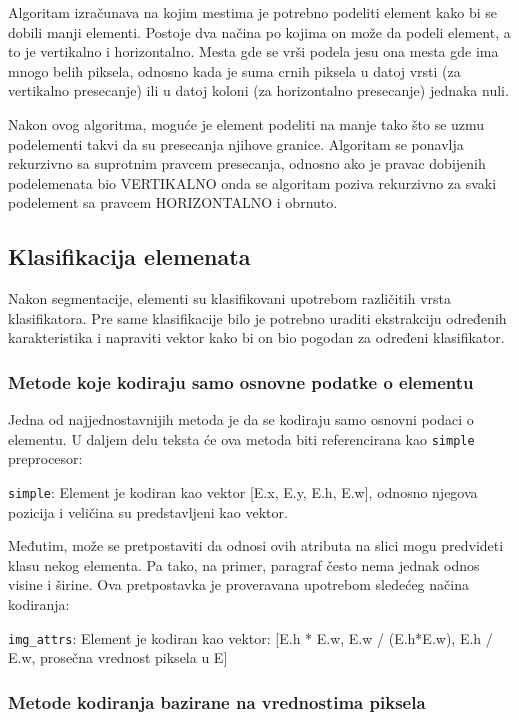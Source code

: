 \documentclass[]{amsart}
\begin{document}
Algoritam izračunava na kojim mestima je potrebno podeliti element kako bi se dobili manji elementi. Postoje dva načina po kojima on može da podeli element, a to je
vertikalno i horizontalno. Mesta gde se vrši podela jesu ona mesta gde ima mnogo belih piksela, odnosno kada je suma crnih piksela u datoj vrsti (za vertikalno presecanje)
ili u datoj koloni (za horizontalno presecanje) jednaka nuli.

Nakon ovog algoritma, moguće je element podeliti na manje tako što se uzmu podelementi takvi da su presecanja njihove granice. Algoritam se ponavlja rekurzivno
sa suprotnim pravcem presecanja, odnosno ako je pravac dobijenih podelemenata bio VERTIKALNO onda se algoritam poziva rekurzivno za svaki podelement sa pravcem HORIZONTALNO
i obrnuto. 

\subsection{Klasifikacija elemenata}
\label{sec:org4f634b4}

Nakon segmentacije, elementi su klasifikovani upotrebom različitih vrsta klasifikatora. Pre same klasifikacije bilo je potrebno uraditi ekstrakciju
određenih karakteristika i napraviti vektor kako bi on bio pogodan za određeni klasifikator.




\subsubsection{Metode koje kodiraju samo osnovne podatke o elementu}
\label{sec:orgd93cd26}

Jedna od najjednostavnijih metoda je da se kodiraju samo osnovni podaci o elementu. U daljem delu teksta će ova metoda biti referencirana kao \texttt{simple} preprocesor:

\texttt{simple}: Element je kodiran kao vektor [E.x, E.y, E.h, E.w], odnosno njegova pozicija i veličina su predstavljeni kao vektor.


Međutim, može se pretpostaviti da odnosi ovih atributa na slici mogu predvideti klasu nekog elementa. Pa tako, na primer, paragraf
često nema jednak odnos visine i širine. Ova pretpostavka je proveravana upotrebom sledećeg načina kodiranja:

\texttt{img\_attrs}: Element je kodiran kao vektor:  [E.h * E.w, E.w / (E.h*E.w), E.h / E.w, prosečna vrednost piksela u E]

\newpage 

\subsubsection{Metode kodiranja bazirane na vrednostima piksela}
\label{sec:org582acb2}
\end{document}
